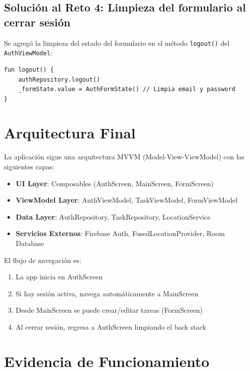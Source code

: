 \documentclass[12pt,a4paper]{article}
\begin{document}
\subsection{Solución al Reto 4: Limpieza del formulario al cerrar sesión}

Se agregó la limpieza del estado del formulario en el método \texttt{logout()} del \texttt{AuthViewModel}:

\begin{lstlisting}[caption={Limpieza de credenciales al cerrar sesión}]
fun logout() {
    authRepository.logout()
    _formState.value = AuthFormState() // Limpia email y password
}
\end{lstlisting}

\section{Arquitectura Final}

La aplicación sigue una arquitectura MVVM (Model-View-ViewModel) con las siguientes capas:

\begin{itemize}
    \item \textbf{UI Layer}: Composables (AuthScreen, MainScreen, FormScreen)
    \item \textbf{ViewModel Layer}: AuthViewModel, TaskViewModel, FormViewModel
    \item \textbf{Data Layer}: AuthRepository, TaskRepository, LocationService
    \item \textbf{Servicios Externos}: Firebase Auth, FusedLocationProvider, Room Database
\end{itemize}

El flujo de navegación es:
\begin{enumerate}
    \item La app inicia en AuthScreen
    \item Si hay sesión activa, navega automáticamente a MainScreen
    \item Desde MainScreen se puede crear/editar tareas (FormScreen)
    \item Al cerrar sesión, regresa a AuthScreen limpiando el back stack
\end{enumerate}

\section{Evidencia de Funcionamiento}
\end{document}

